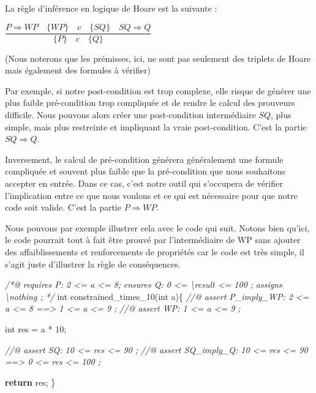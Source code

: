 \documentclass[12pt,francais,]{scrbook}
\newenvironment{Shaded}{}{}
\newcommand{\KeywordTok}[1]{\textcolor[rgb]{0.00,0.44,0.13}{\textbf{{#1}}}}
\newcommand{\DataTypeTok}[1]{\textcolor[rgb]{0.56,0.13,0.00}{{#1}}}
\newcommand{\DecValTok}[1]{\textcolor[rgb]{0.25,0.63,0.44}{{#1}}}
\newcommand{\CommentTok}[1]{\textcolor[rgb]{0.38,0.63,0.69}{\textit{{#1}}}}
\newcommand{\NormalTok}[1]{{#1}}
\begin{document}
La règle d'inférence en logique de Hoare est la suivante :

\begin{center}\(\dfrac{P \Rightarrow WP \quad \{WP\}\quad c\quad \{SQ\} \quad SQ \Rightarrow Q}{\{P\}\quad c \quad \{Q\}}\)\end{center}

(Nous noterons que les prémisses, ici, ne sont pas seulement des
triplets de Hoare mais également des formules à vérifier)

Par exemple, si notre post-condition est trop complexe, elle risque de
générer une plus faible pré-condition trop compliquée et de rendre le
calcul des prouveurs difficile. Nous pouvons alors créer une
post-condition intermédiaire \(SQ\), plus simple, mais plus restreinte
et impliquant la vraie post-condition. C'est la partie
\(SQ \Rightarrow Q\).

Inversement, le calcul de pré-condition générera généralement une
formule compliquée et souvent plus faible que la pré-condition que nous
souhaitons accepter en entrée. Dans ce cas, c'est notre outil qui
s'occupera de vérifier l'implication entre ce que nous voulons et ce qui
est nécessaire pour que notre code soit valide. C'est la partie
\(P \Rightarrow WP\).

Nous pouvons par exemple illustrer cela avec le code qui suit. Notons
bien qu'ici, le code pourrait tout à fait être prouvé par
l'intermédiaire de WP sans ajouter des affaiblissements et renforcements
de propriétés car le code est très simple, il s'agit juste d'illustrer
la règle de conséquences.

\begin{footnotesize}\begin{Shaded}
\begin{Highlighting}[]
\CommentTok{/*@}
\CommentTok{  requires P: 2 <= a <= 8;}
\CommentTok{  ensures  Q: 0 <= \textbackslash{}result <= 100 ;}
\CommentTok{  assigns  \textbackslash{}nothing ;}
\CommentTok{*/}
\DataTypeTok{int} \NormalTok{constrained_times_10(}\DataTypeTok{int} \NormalTok{a)\{}
  \CommentTok{//@ assert P_imply_WP: 2 <= a <= 8 ==> 1 <= a <= 9 ;}
  \CommentTok{//@ assert WP:         1 <= a <= 9 ;}

  \DataTypeTok{int} \NormalTok{res = a * }\DecValTok{10}\NormalTok{;}

  \CommentTok{//@ assert SQ:         10 <= res <= 90 ;}
  \CommentTok{//@ assert SQ_imply_Q: 10 <= res <= 90 ==> 0 <= res <= 100 ;}

  \KeywordTok{return} \NormalTok{res;}
\NormalTok{\}}
\end{Highlighting}
\end{Shaded}\end{footnotesize}
\end{document}
